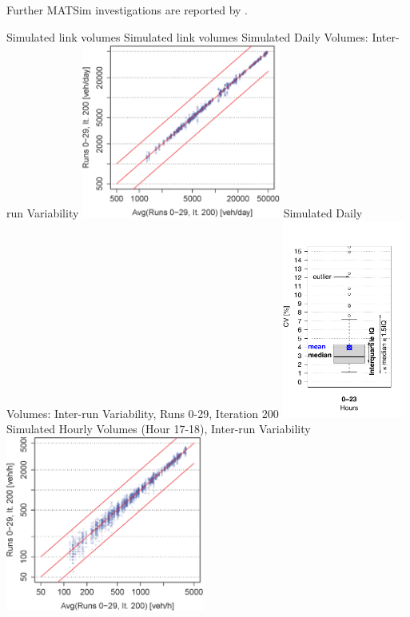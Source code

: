 Further MATSim investigations are reported by \citet[][]{Hackney_PhDThesis_2009, Neumann_PhDThesis_2014}.

\createfigure%
{Simulated link volumes}%
{Simulated link volumes}%
{\label{fig:linkVolumes}}%
{%
  \createsubfigure%
  {Simulated Daily Volumes: Inter-run Variability}%
	{\includegraphics[width=0.49\textwidth]{understanding/figures/var/linkVolumesAWTVInterScatter.png}}%
	{\label{fig:linkVolumesAWTVInterScatter}}%
  {}%
	\createsubfigure%
  {Simulated Daily Volumes: Inter-run Variability, Runs 0-29, Iteration 200}%
	{\includegraphics[width=0.3\textwidth]{understanding/figures/var/linkVolumesInterAWTV200.pdf}}%
	{\label{fig:linkVolumesInterAWTV200}}%
  {}%
  \createsubfigure%
  {Simulated Hourly Volumes (Hour 17-18), Inter-run Variability}%
	{\includegraphics[width=0.49\textwidth]{understanding/figures/var/linkVolumesHour17-18InterScatter.png}}%
}
